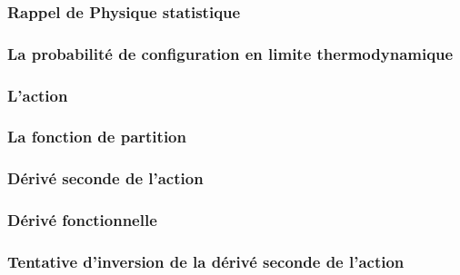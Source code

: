 


\subsubsection{Rappel de Physique statistique}
	

\subsubsection{La probabilité de configuration en limite thermodynamique}
		

\subsubsection{L'action}

\subsubsection{La fonction de partition}	
	

\subsubsection{Dérivé seconde de l'action}
	
	
\subsubsection{Dérivé fonctionnelle}
	
\subsubsection{Tentative d'inversion de la dérivé seconde de l'action}
	
